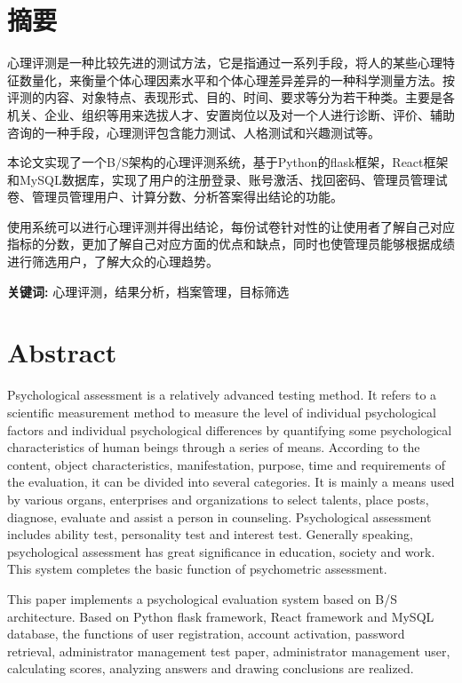 \section*{ \centering 摘要}

\vskip0.5cm
心理评测是一种比较先进的测试方法，它是指通过一系列手段，将人的某些心理特征数量化，来衡量个体心理因素水平和个体心理差异差异的一种科学测量方法。按评测的内容、对象特点、表现形式、目的、时间、要求等分为若干种类。主要是各机关、企业、组织等用来选拔人才、安置岗位以及对一个人进行诊断、评价、辅助咨询的一种手段，心理测评包含能力测试、人格测试和兴趣测试等。

本论文实现了一个B/S架构的心理评测系统，基于Python的flask框架，React框架和MySQL数据库，实现了用户的注册登录、账号激活、找回密码、管理员管理试卷、管理员管理用户、计算分数、分析答案得出结论的功能。

使用系统可以进行心理评测并得出结论，每份试卷针对性的让使用者了解自己对应指标的分数，更加了解自己对应方面的优点和缺点，同时也使管理员能够根据成绩进行筛选用户，了解大众的心理趋势。


\textbf{关键词:}  心理评测，结果分析，档案管理，目标筛选

\clearpage
\section*{ \centering \textbf{Abstract} }

Psychological assessment is a relatively advanced testing method. It refers to a scientific measurement method to measure the level of individual psychological factors and individual psychological differences by quantifying some psychological characteristics of human beings through a series of means. According to the content, object characteristics, manifestation, purpose, time and requirements of the evaluation, it can be divided into several categories. It is mainly a means used by various organs, enterprises and organizations to select talents, place posts, diagnose, evaluate and assist a person in counseling. Psychological assessment includes ability test, personality test and interest test. Generally speaking, psychological assessment has great significance in education, society and work. This system completes the basic function of psychometric assessment.

This paper implements a psychological evaluation system based on B/S architecture. Based on Python flask framework, React framework and MySQL database, the functions of user registration, account activation, password retrieval, administrator management test paper, administrator management user, calculating scores, analyzing answers and drawing conclusions are realized.

